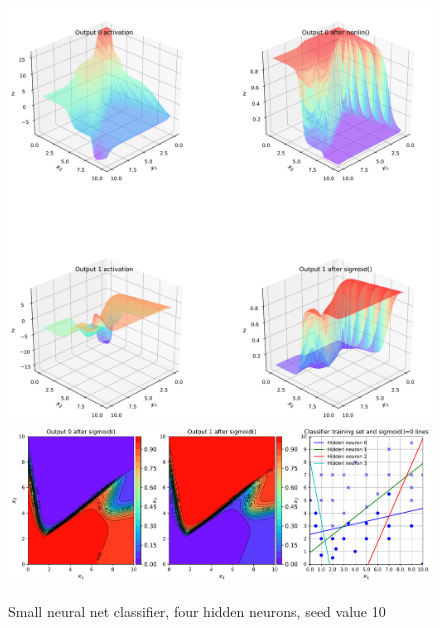 \FloatBarrier
 
\begin{figure}[p]
\centering
\includegraphics[width=\textwidth]{pic/chC-classifa04}
\includegraphics[width=\textwidth]{pic/chC-classifb04}
\caption{Small neural net classifier, four hidden neurons, seed value 10}
\label{fig:chC-classif04}
\end{figure}

